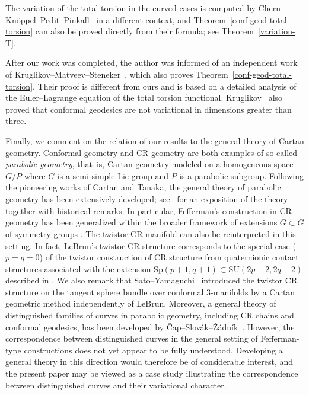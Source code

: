 \documentclass[pdftex]{sigma}
\numberwithin{equation}{section}
\begin{document}
The variation of the total torsion in the curved cases is computed by Chern--Kn\"oppel--Pedit--Pinkall~\cite{CKPP} in a different context, and Theorem~\ref{conf-geod-total-torsion} can also be proved directly from their formula; see Theorem~\ref{variation-T}.

After our work was completed, the author was informed of an independent work of
 Kruglikov--Matveev--Steneker~\cite{KMS}, which also proves Theorem~\ref{conf-geod-total-torsion}. Their proof is different from ours and is based on a detailed analysis of the Euler--Lagrange equation of the total torsion functional. Kruglikov~\cite{K} also proved that conformal geodesics are not variational in dimensions greater than three.

 Finally, we comment on the relation of our results to the general theory of Cartan geometry. Conformal geometry and CR geometry are both examples of so-called {\it parabolic geometry}, that~is, Cartan geometry modeled on a homogeneous space $G/P$ where $G$ is a semi-simple Lie group and $P$ is a parabolic subgroup. Following the pioneering works of Cartan and Tanaka, the general theory of parabolic geometry has been extensively developed; see~\cite{CS} for an exposition of the theory together with historical remarks.
In particular, Fefferman's construction in CR geometry has been generalized within the broader framework of extensions $G\subset \widetilde G$ of symmetry groups \cite{C, CS}. The twistor CR manifold can also be reinterpreted in this setting. In fact, LeBrun's twistor CR structure corresponds to the special case ($p=q=0$) of the twistor construction of CR structure from quaternionic contact structures associated with the extension $\mathrm{Sp}(p+1, q+1)\subset \mathrm{SU}(2p+2, 2q+2)$ described in \cite[Section~4.5.5]{CS}. We also remark that Sato--Yamaguchi~\cite{SY} introduced the twistor CR structure on the tangent sphere bundle over conformal 3-manifolds by a Cartan geometric method independently of LeBrun. Moreover, a general theory of distinguished families of curves in parabolic geometry, including CR chains and conformal geodesics, has been developed by \v{C}ap--Slov\'ak--\v Z\'adn\'ik~\cite{CSZ}. However, the correspondence between distinguished curves in the general setting of Fefferman-type constructions does not yet appear to be fully understood. Developing a general theory in this direction would therefore be of considerable interest, and the present paper may be viewed as a case study illustrating the correspondence between distinguished curves and their variational character.
\end{document}
